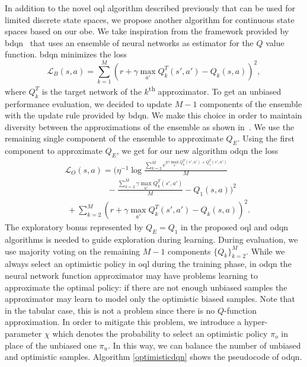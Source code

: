 In addition to the novel \gls{oql} algorithm described previously that can be used for limited discrete state spaces, we
propose another algorithm for continuous state spaces based on our \gls{obe}. We take inspiration from the framework provided by \gls{bdqn}~\cite{osband2017deep}
that uses an ensemble of neural networks as estimator for the $Q$ value function.
\gls{bdqn} minimizes the loss
\begin{equation}
	\mathcal{L}_B(s,a)\! = \! \sum_{k=1}^M (r + \gamma \max_{a'}Q_k^T(s',a') - Q_k(s,a))^2, \nonumber
\end{equation}
where $Q_k^T$ is the target network of the $k$\textsuperscript{th} approximator. 
To get an unbiased performance evaluation, we decided to update $M-1$ components of the ensemble with the update rule provided by \gls{bdqn}. We make this choice in order to maintain diversity between the approximations of the ensemble as shown in~\cite{osband2016deep}. We use the remaining single component of the ensemble to approximate $Q_E$. Using the first component to approximate $Q_E$, we get for our new algorithm \gls{odqn} the loss
\begin{eqnarray}
	&\mathcal{L}_O(s,a) = (\eta^{-1}\log \frac{\sum_{k=2}^M
	 e^{\eta\gamma\max_{a'}Q_k^T(s',a')+ Q_1^T(s',a')}}{M}\nonumber \\
&\qquad\qquad\;\;\;\;  -  \frac{\sum_{k=2}^M  \gamma\max_{a'}Q^T_k(s',a')}{M} -Q_1(s,a))^2\nonumber \\
&\;  + \sum_{k=2}^M (r + \gamma\max_{a'}Q^T_k(s',a') -
	 Q_k(s,a))^2.  \label{optimisticloss}
\end{eqnarray}
The exploratory bonus represented by $Q_E = Q_1$ in the proposed \gls{oql} and \gls{odqn} algorithms is needed to
guide exploration during learning. During evaluation, we use majority voting on the remaining $M-1$
components $\{Q_k\}_{k=2}^M$. While we always select an optimistic policy in \gls{oql} during the training phase, in
\gls{odqn} the neural network function approximator may have problems learning to approximate the optimal
policy: if there are not enough unbiased samples the approximator may learn to model only the optimistic
biased samples. Note that in the tabular case, this is not a problem since there is no $Q$-function
approximation. In order to mitigate this problem, we introduce a hyper-parameter $\chi$ which denotes the probability to select an optimistic policy $\pi_o$ in place of the unbiased one $\pi_u$. In this way, we can balance the number of unbiased and optimistic samples.
Algorithm \ref{optimisticdqn} shows the pseudocode of \gls{odqn}. 
